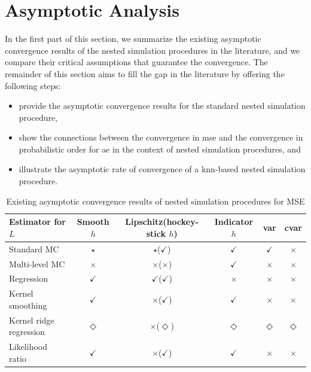 \section{Asymptotic Analysis}\label{sec1:asymptotic-convergence}
In the first part of this section, we summarize the existing asymptotic convergence results of the nested simulation procedures in the literature, and we compare their critical assumptions that guarantee the convergence.
The remainder of this section aims to fill the gap in the literature by offering the following steps:
\begin{itemize}
    \item provide the asymptotic convergence results for the standard nested simulation procedure, 
    \item show the connections between the convergence in \gls{mse} and the convergence in probabilistic order for \gls{ae} in the context of nested simulation procedures, and
    \item illustrate the asymptotic rate of convergence of a \gls{knn}-based nested simulation procedure.
\end{itemize}

\begin{table}[ht]
    \centering
    \footnotesize
    \begin{tabular}{|l|c|c|c|c|c|}
    \hline
    \textbf{Estimator for} $L$ & \textbf{Smooth} $h$ & \textbf{Lipschitz}(\textbf{hockey-stick} $h$) & \textbf{Indicator} $h$ & \textbf{\gls{var}} & \textbf{\gls{cvar}} \\
    \hline
    Standard MC & $\star$ & $\star$($\checkmark$) & $\checkmark$ & $\checkmark$ & $\times$ \\
    \hline
    Multi-level MC & $\times$ & $\times$($\times$) & $\checkmark$ & $\times$ & $\times$ \\
    \hline
    Regression & $\checkmark$ & $\checkmark$($\checkmark$) & $\times$ & $\times$ & $\times$ \\
    \hline
    Kernel smoothing & $\checkmark$ & $\times$($\checkmark$) & $\checkmark$ & $\times$ & $\times$ \\
    \hline
    Kernel ridge regression & $\Diamond$ & $\times$($\Diamond$) & $\Diamond$ & $\Diamond$ & $\Diamond$ \\
    \hline
    Likelihood ratio & $\checkmark$ & $\times$($\checkmark$) & $\checkmark$ & $\times$ & $\times$ \\
    \hline
    \end{tabular}
    \caption{Existing asymptotic convergence results of nested simulation procedures for MSE}
\label{tab1:asymConv-mse}
\end{table}


